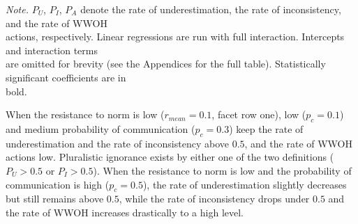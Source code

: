 \documentclass[
  11pt,
]{article}
\begin{document}
\begin{table}
\begin{threeparttable}
{\begin{tabular}[t]{>{\raggedright\arraybackslash}p{0.5in}cccccccccccc}
\bottomrule
\end{tabular}}
\begin{tablenotes}
\small
\item \textit{Note.} $P_U$, $P_I$, $P_A$ denote the rate of underestimation, the rate of inconsistency, and the rate of WWOH \\actions, respectively. Linear regressions are run with full interaction. Intercepts and interaction terms \\are omitted for brevity (see the Appendices for the full table). Statistically significant coefficients are in \\ bold.
\end{tablenotes}
\end{threeparttable}
\label{tab:2}
\end{table}

\endgroup

When the resistance to norm is low (\(r_{mean} = 0.1\), facet row one),
low (\(p_c = 0.1\)) and medium probability of communication
(\(p_c = 0.3\)) keep the rate of underestimation and the rate of
inconsistency above \(0.5\), and the rate of WWOH actions low.
Pluralistic ignorance exists by either one of the two definitions
(\(P_U > 0.5\) or \(P_I > 0.5\)). When the resistance to norm is low and
the probability of communication is high (\(p_c = 0.5\)), the rate of
underestimation slightly decreases but still remains above \(0.5\),
while the rate of inconsistency drops under \(0.5\) and the rate of WWOH
increases drastically to a high level.
\end{document}
